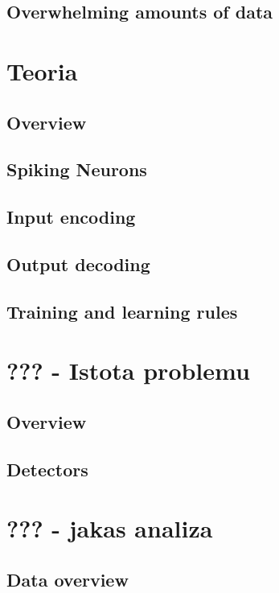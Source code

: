 \documentclass{pracalicmgr2021}
\begin{document}
    \section{Overwhelming amounts of data}
    
    
    \chapter{Teoria}
    \section{Overview}
    
    \section{Spiking Neurons}
    
    \section{Input encoding}
    
    \section{Output decoding}
    
    \section{Training and learning rules}
    
    
    \chapter{??? - Istota problemu}
    \section{Overview}
    
    \section{Detectors}
    
    
    \chapter{??? - jakas analiza}
    \section{Data overview}
    
\end{document}
